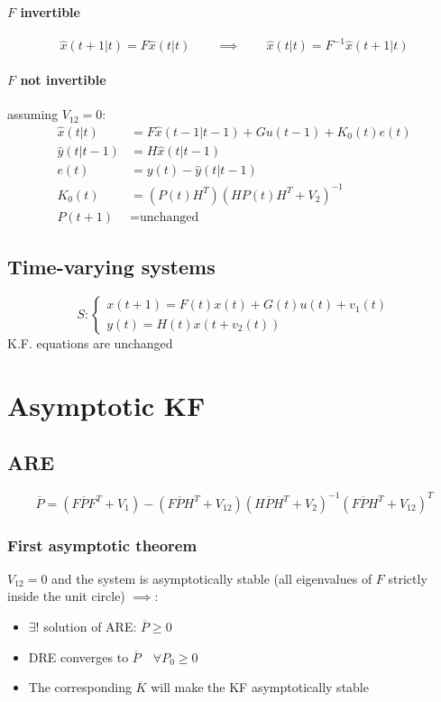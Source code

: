 \documentclass{article}
\begin{document}
\paragraph{$F$ invertible}
\[
\hat{x}(t+1|t)=F\hat{x}(t|t)
\qquad\implies\qquad
\hat{x}(t|t)=F^{-1}\hat{x}(t+1|t)
\]
\paragraph{$F$ not invertible} assuming $V_{12}=0$:
\begin{align*}
\hat{x}(t|t)&=F\hat{x}(t-1|t-1)+Gu(t-1)+K_0(t)e(t)\\
\hat{y}(t|t-1)&=H\hat{x}(t|t-1)\\
e(t)&=y(t)-\hat{y}(t|t-1)\\
K_0(t)&=\left(P(t)H^T\right)\left(HP(t)H^T+V_2\right)^{-1}\\
P(t+1)&=\text{unchanged }
\end{align*}
\subsection{Time-varying systems}
\[
S:\begin{cases}
x(t+1)=F(t)x(t)+G(t)u(t)+v_1(t)\\
y(t)=H(t)x(t+v_2(t))
\end{cases}
\]
K.F. equations are unchanged
\section{Asymptotic KF}
\subsection{ARE}
\[
\overline{P}=
\left(
F\overline{P}F^T+V_1
\right)-\left(
F\overline{P}H^T+V_{12}
\right)\left(
H\overline{P}H^T+V_2
\right)^{-1}\left(
F\overline{P}H^T+V_{12}
\right)^T
\]
\subsubsection{First asymptotic theorem}
$V_{12}=0$ and the system is asymptotically stable (all eigenvalues of $F$ strictly inside the unit circle) $\implies$:
\begin{itemize}
\item $\exists!$ solution of ARE: $\overline{P}\geq 0$
\item DRE converges to $\overline{P}\quad\forall P_0\geq 0$
\item The corresponding $\overline{K}$ will make the KF asymptotically stable
\end{itemize}
\end{document}
